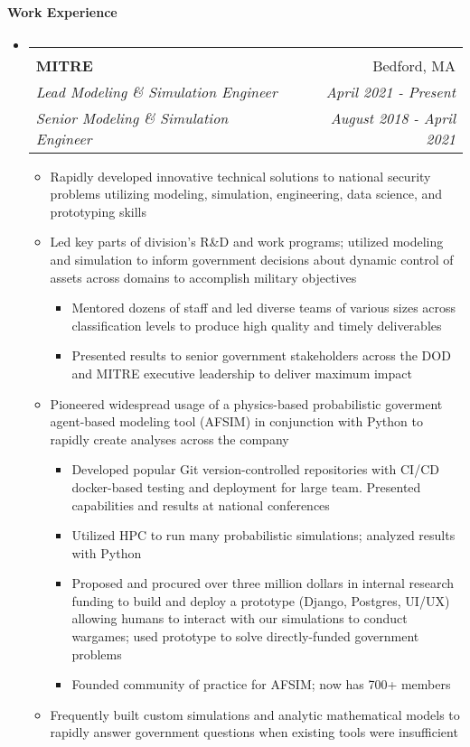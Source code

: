 \documentclass[letterpaper,11pt]{article}
\makeatletter
\newcommand{\resheading}[1]
{
        \vspace{2pt}
        \phantomsection
        \addcontentsline{toc}{section}{#1}
        {\large \colorbox{mygrey}{
        \begin{minipage}{\textwidth}{
                \textbf{#1 \vphantom{p\^{E}}}}
        \end{minipage}}
        }
        \vspace{-11pt}
}
\newcommand{\ressubheadingmitre}[6]{\vspace{-29pt}
\begin{tabular*}{7.0in}{l@{\extracolsep{\fill}}r}
				\vspace{15pt} %
                \\
                \textbf{#1} & #2 \\
                \textit{#3} & \textit{#4} \\
                \textit{#5} & \textit{#6}
\end{tabular*}\vspace{-6pt}}
\makeatother
\begin{document}
\resheading{Work Experience}

\begin{itemize}
\item \ressubheadingmitre{MITRE}{Bedford, MA}{Lead Modeling \& Simulation Engineer}{April 2021 - Present}{Senior Modeling \& Simulation Engineer}{August 2018 - April 2021}

\begin{itemize}
\item Rapidly developed innovative technical solutions to national security problems utilizing modeling, simulation, engineering, data science, and prototyping skills

\item Led key parts of division's R\&D and work programs; utilized modeling and simulation to inform government decisions about dynamic control of assets across domains to accomplish military objectives
\begin{itemize}
\item Mentored dozens of staff and led diverse teams of various sizes across classification levels to produce high quality and timely deliverables
\item Presented results to senior government stakeholders across the DOD and MITRE executive leadership to deliver maximum impact
\end{itemize}


\item Pioneered widespread usage of a physics-based probabilistic goverment agent-based modeling tool (AFSIM) in conjunction with Python to rapidly create analyses across the company 
\begin{itemize}
\item Developed popular Git version-controlled repositories with CI/CD docker-based testing and deployment for large team. Presented capabilities and results at national conferences
\item Utilized HPC to run many probabilistic simulations; analyzed results with Python 
\item  Proposed and procured over three million dollars in internal research funding to build and deploy a prototype (Django, Postgres, UI/UX) allowing humans to interact with our simulations to conduct wargames; used prototype to solve directly-funded government problems
\item Founded community of practice for AFSIM; now has 700+ members
\end{itemize}
\item{Frequently built custom simulations and analytic mathematical models to rapidly answer government questions when existing tools were insufficient}
\end{itemize}
\end{itemize}
\end{document}
